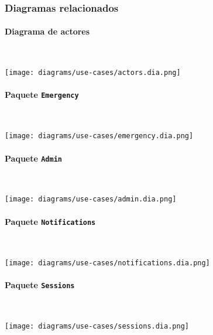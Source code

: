 \subsubsection{Diagramas relacionados}
\paragraph{Diagrama de actores} \hfill \\
\begin{minipage}{\linewidth}
    \texttt{[image: diagrams/use-cases/actors.dia.png]}
\end{minipage}

\clearpage
\paragraph{Paquete \texttt{Emergency}} \hfill \\
\begin{minipage}{\linewidth}
    \texttt{[image: diagrams/use-cases/emergency.dia.png]}
\end{minipage}

\paragraph{Paquete \texttt{Admin}} \hfill \\
\begin{minipage}{\linewidth}
    \texttt{[image: diagrams/use-cases/admin.dia.png]}
\end{minipage}

\paragraph{Paquete \texttt{Notifications}} \hfill \\
\begin{minipage}{\linewidth}
    \texttt{[image: diagrams/use-cases/notifications.dia.png]}
\end{minipage}

\paragraph{Paquete \texttt{Sessions}} \hfill \\
\begin{minipage}{\linewidth}
    \texttt{[image: diagrams/use-cases/sessions.dia.png]}
\end{minipage}

